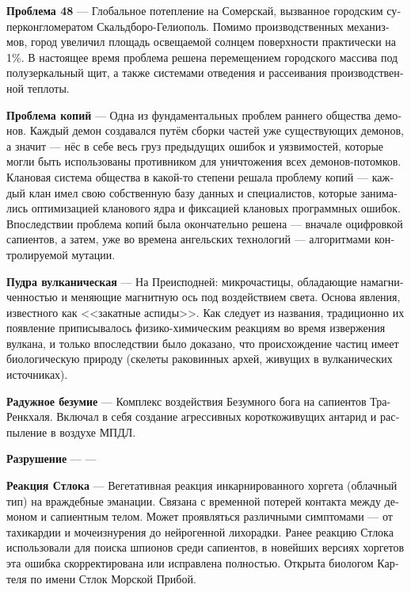 \documentclass[a4paper,12pt,fleqn]{book}\usepackage{cooltooltips}\usepackage{polyglossia}\setdefaultlanguage[babelshorthands=true]{russian}\setotherlanguage{english}\defaultfontfeatures{Ligatures=TeX,Mapping=tex-text} \usepackage{xcolor}\definecolor{lightgray}{HTML}{bbbbbb}\color{lightgray}\newcommand{\ml}[3]{\textenglish{\textcolor{black}{#3}}}
\newcommand{\theterm}[3]{\textbf{\hypertarget{#1}{#2}} --- #3}
\begin{document}
{\theterm{problem-48}
{Проблема 48}
{Глобальное потепление на Сомерскай, вызванное городским суперконгломератом Скальдборо-Гелиополь.
Помимо производственных механизмов, город увеличил площадь освещаемой солнцем поверхности практически на 1\%.
В настоящее время проблема решена перемещением городского массива под полузеркальный щит, а также системами отведения и рассеивания производственной теплоты.}

\theterm{copies-problem}
{Проблема копий}
{Одна из фундаментальных проблем раннего общества демонов.
Каждый демон создавался путём сборки частей уже существующих демонов, а значит --- нёс в себе весь груз предыдущих ошибок и уязвимостей, которые могли быть использованы противником для уничтожения всех демонов-потомков.
Клановая система общества в какой-то степени решала проблему копий --- каждый клан имел свою собственную базу данных и специалистов, которые занимались оптимизацией кланового ядра и фиксацией клановых программных ошибок.
Впоследствии проблема копий была окончательно решена --- вначале оцифровкой сапиентов, а затем, уже во времена ангельских технологий --- алгоритмами контролируемой мутации.}

\theterm{volcanic-facepowder}
{Пудра вулканическая}
{На Преисподней: микрочастицы, обладающие намагниченностью и меняющие магнитную ось под воздействием света. 
Основа явления, известного как <<закатные аспиды>>.
Как следует из названия, традиционно их появление приписывалось физико-химическим реакциям во время извержения вулкана, и только впоследствии было доказано, что происхождение частиц имеет биологическую природу (скелеты раковинных архей, живущих в вулканических источниках).}

\theterm{rainbow-madness}
{Радужное безумие}
{Комплекс воздействия Безумного бога на сапиентов Тра-Ренкхаля.
Включал в себя создание агрессивных короткоживущих антарид и распыление в воздухе МПДЛ.}

\theterm{destruction}
{Разрушение}
{---}

\theterm{stlock-reaction}
{Реакция Стлока}
{Вегетативная реакция инкарнированного хоргета (облачный тип) на враждебные эманации.
Связана с временной потерей контакта между демоном и сапиентным телом.
Может проявляться различными симптомами --- от тахикардии и мочеизнурения до нейрогенной лихорадки.
Ранее реакцию Стлока использовали для поиска шпионов среди сапиентов, в новейших версиях хоргетов эта ошибка скорректирована или исправлена полностью.
Открыта биологом Картеля по имени Стлок Морской Прибой.}

}
\end{document}
